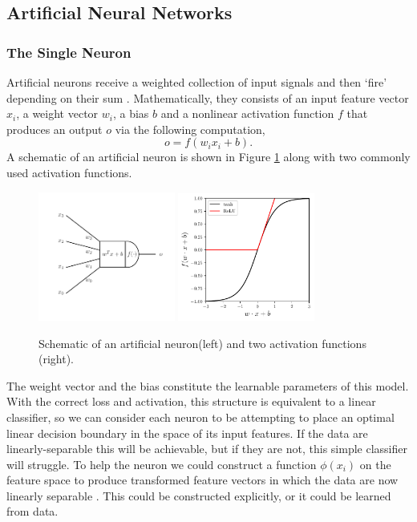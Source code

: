 \subsection{Artificial Neural Networks}

\subsubsection{The Single Neuron}
Artificial neurons receive a weighted collection of input signals and then `fire' depending on their sum \cite{CS231n}. Mathematically, they consists of an input feature vector $x_{i}$, a weight vector $w_{i}$, a bias $b$ and a nonlinear activation function $f$ that produces an output $o$ via the following computation,
\begin{equation}
    o = f(w_{i}x_{i} + b).
\end{equation}
A schematic of an artificial neuron is shown in Figure \ref{fig:machine_learning:neuron_and_activation} along with two commonly used activation functions. 
\begin{figure}[h!]
    \begin{center}
        \includegraphics[width=0.4\textwidth]{figures/machine_learning/neuron.pdf}
        \includegraphics[width=0.4\textwidth]{figures/machine_learning/activation_functions.pdf}
    \end{center}
    \caption{Schematic of an artificial neuron(left) and two activation functions (right).}
        \label{fig:machine_learning:neuron_and_activation}
\end{figure}
The weight vector and the bias constitute the learnable parameters of this model. 
With the correct loss and activation, this structure is equivalent to a linear classifier, so we can consider each neuron to be attempting to place an optimal linear decision boundary in the space of its input features. 
If the data are linearly-separable this will be achievable, but if they are not, this simple classifier will struggle. 
To help the neuron we could construct a function $\phi(x_{i})$ on the feature space to produce transformed feature vectors in which the data are now linearly separable \cite{DeepLearningBook}. 
This could be constructed explicitly, or it could be learned from data. 



